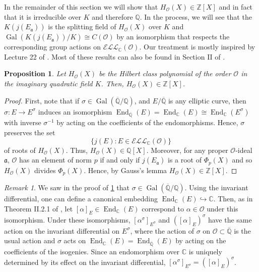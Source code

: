 \documentclass{amsart}
\newtheorem{prop}[thm]{Proposition}
\theoremstyle{definition}
\theoremstyle{remark}
\newtheorem{remark}[thm]{Remark}
\numberwithin{equation}{section}
\newcommand{\cE}{\mathcal E}
\newcommand{\cL}{\mathcal L}
\newcommand{\cO}{\mathcal O}
\newcommand{\fka}{\mathfrak a}
\newcommand{\bbC}{\mathbb C}
\newcommand{\bbQ}{\mathbb Q}
\newcommand{\bbZ}{\mathbb Z}
\newcommand{\inv}{^{-1}}
\newcommand{\ELL}{\cE\cL\cL}
\DeclareMathOperator{\End}{End}
\DeclareMathOperator{\Gal}{Gal}
\begin{document}
 In the remainder of this section we will show that $H_{\cO}(X) \in \bbZ[X]$ and in fact that it is irreducible over $K$ and therefore $\bbQ$. In the process, we will see that the $K(j(E_{\fka}))$ is the splitting field of $H_{\cO}(X)$ over $K$ and $\Gal(K(j(E_{\fka}))/K) \cong C(\cO)$ by an isomorphism that respects the corresponding group actions on $\ELL_{\bbC}(\cO)$. Our treatment is mostly inspired by Lecture 22 of \cite{SutherlandLN}.
 Most of these results can also be found in Section II of \cite{SilvermanATAEC}.
 
 \begin{prop} \label{prop:HilbertPolyHasIntegerCoeffs}
 Let $H_{\cO}(X)$ be the Hilbert class polynomial of the order $\cO$ in the imaginary quadratic field $K$. Then, $H_{\cO}(X) \in \bbZ[X]$.
 \end{prop}

\begin{proof}
 First, note that if $\sigma \in \Gal(\overline{\bbQ}/ \bbQ)$, and $E/\overline{\bbQ}$ is any elliptic curve, then $\sigma: E \to E^{\sigma}$ induces an isomorphism $\End_{\overline{\bbQ}}(E) = \End_{\bbC}(E) \cong \End_{\bbC}(E^{\sigma})$ with inverse $\sigma\inv$ by acting on the coefficients of the endomorphisms. Hence, $\sigma$ preserves the set 
 \[
 \{j(E): E \in \ELL_{\bbC}(\cO)\}
 \]
  of roots of $H_{\cO}(X)$. Thus, $H_{\cO}(X) \in \bbQ[X]$. Moreover, for any proper $\cO$-ideal $\fka$, $\cO$ has an element of norm $p$ if and only if $j(E_{\fka})$ is a root of $\Phi_{p}(X)$ and so $H_{\cO}(X)$ divides $\Phi_{p}(X)$. Hence, by Gauss's lemma $H_{\cO}(X) \in \bbZ[X]$.
\end{proof}

\begin{remark} \label{rem:GaloisInducesCanonicalIsoOfEnd}
 We saw in the proof of \ref{prop:HilbertPolyHasIntegerCoeffs} that $\sigma \in \Gal(\overline{\bbQ}/ \bbQ)$. Using the invariant differential, one can define a canonical embedding $ \End_{\bbC}(E) \hookrightarrow \bbC$. Then, as in Theorem II.2.1 of \cite{SilvermanATAEC}, let $[\alpha]_{E} \in \End_{\bbC}(E)$ correspond to $\alpha \in \cO$ under this isomorphism. Under these isomorphisms, $[\alpha^{\sigma}]_{E^{\sigma}}$ and $([\alpha]_{E})^{\sigma}$ have the same action on the invariant differential on $E^{\sigma}$, where the action of $\sigma$ on $\cO \subset \overline{\bbQ}$ is the usual action and $\sigma$ acts on $\End_{\bbC}(E) = \End_{\overline{\bbQ}}(E)$ by acting on the coefficients of the isogenies. Since an endomorphism over $\bbC$ is uniquely determined by its effect on the invariant differential, $[\alpha^{\sigma}]_{E^{\sigma}} = ([\alpha]_{E})^{\sigma}$.
 \end{remark}
 
\end{document}
